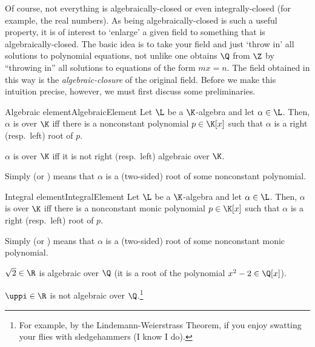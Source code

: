 Of course, not everything is algebraically-closed or even integrally-closed (for example, the real numbers).  As being algebraically-closed is such a useful property, it is of interest to `enlarge' a given field to something that is algebraically-closed.  The basic idea is to take your field and just `throw in' all solutions to polynomial equations, not unlike one obtains $\Q$ from $\Z$ by ``throwing in'' all solutions to equations of the form $mx=n$.  The field obtained in this way is the \emph{algebraic-closure} of the original field.  Before we make this intuition precise, however, we must first discuss some preliminaries.
\begin{dfn}{Algebraic element}{AlgebraicElement}
	Let $\L$ be a $\K$-algebra and let $\alpha \in \L$.  Then, $\alpha$ is  over $\K$ iff there is a nonconstant polynomial $p\in \K [x]$ such that $\alpha$ is a right (resp.~left) root of $p$.
	
	$\alpha$ is  over $\K$ iff it is not right (resp.~left) algebraic over $\K$.
	\begin{rmk}
		Simply  (or ) means that $\alpha$ is a (two-sided) root of some nonconstant polynomial.
	\end{rmk}
\end{dfn}
\begin{dfn}{Integral element}{IntegralElement}
	Let $\L$ be a $\K$-algebra and let $\alpha \in \L$.  Then, $\alpha$ is  over $\K$ iff there is a nonconstant monic polynomial $p\in \K [x]$ such that $\alpha$ is a right (resp.~left) root of $p$.
	\begin{rmk}
		Simply  (or ) means that $\alpha$ is a (two-sided) root of some nonconstant monic polynomial.
	\end{rmk}
\end{dfn}
\begin{exm}{}{}
	$\sqrt{2}\in \R$ is algebraic over $\Q$ (it is a root of the polynomial $x^2-2\in \Q [x]$).
	
	$\uppi \in \R$ is not algebraic over $\Q$.\footnote{For example, by the Lindemann-Weierstrass Theorem, if you enjoy swatting your flies with sledgehammers (I know I do).}
\end{exm}
